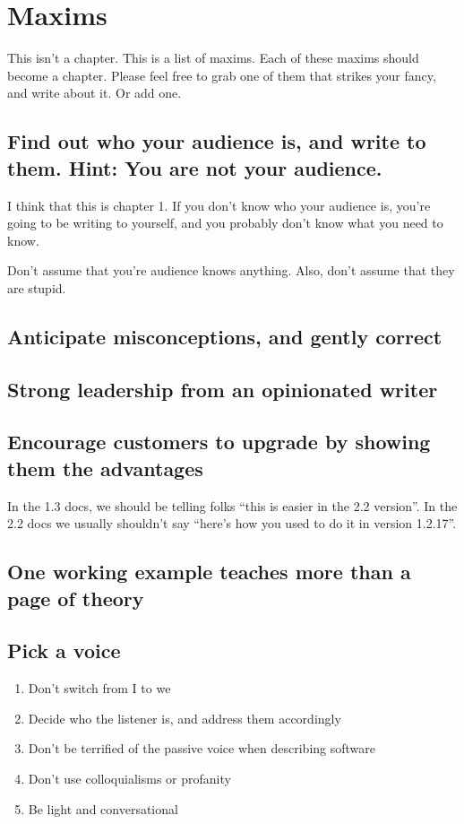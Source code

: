 \chapter{Maxims}

This isn't a chapter. This is a list of maxims. Each of these maxims
should become a chapter. Please feel free to grab one of them that
strikes your fancy, and write about it. Or add one.

\section{Find out who your audience is, and write to them. Hint: You are
not your audience.}

I think that this is chapter 1. If you don't know who your audience is,
you're going to be writing to yourself, and you probably don't know what
you need to know.

Don't assume that you're audience knows anything. Also, don't assume
that they are stupid.

\section{Anticipate misconceptions, and gently correct}

\section{Strong leadership from an opinionated writer}

\section{Encourage customers to upgrade by showing them the advantages}

In the 1.3 docs, we should be telling folks ``this is easier in the 2.2
version''. In the 2.2 docs we usually shouldn't say ``here's how you
used to do it in version 1.2.17''.

\section{One working example teaches more than a page of theory}

\section{Pick a voice}
\begin{enumerate}
\item Don't switch from I to we
\item Decide who the listener is, and address them accordingly
\item Don't be terrified of the passive voice when describing software
\item Don't use colloquialisms or profanity
\item Be light and conversational
\end{enumerate}
